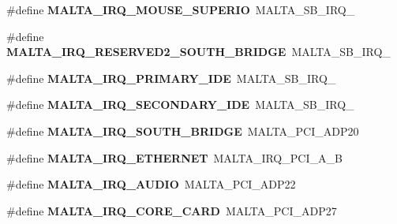 \begin{DoxyCompactItemize}
\item 
\mbox{\label{group__bsp__interrupt_ga2f977174ebf4926653deacb3089e43fb}} 
\#define {\bfseries M\+A\+L\+T\+A\+\_\+\+I\+R\+Q\+\_\+\+M\+O\+U\+S\+E\+\_\+\+S\+U\+P\+E\+R\+IO}~M\+A\+L\+T\+A\+\_\+\+S\+B\+\_\+\+I\+R\+Q\+\_
\item 
\mbox{\label{group__bsp__interrupt_gad53504e3b3b9d08772d3ac8b610424d3}} 
\#define {\bfseries M\+A\+L\+T\+A\+\_\+\+I\+R\+Q\+\_\+\+R\+E\+S\+E\+R\+V\+E\+D2\+\_\+\+S\+O\+U\+T\+H\+\_\+\+B\+R\+I\+D\+GE}~M\+A\+L\+T\+A\+\_\+\+S\+B\+\_\+\+I\+R\+Q\+\_
\item 
\mbox{\label{group__bsp__interrupt_ga225dd482d2b7455e7a8d87bc9a5c8e1f}} 
\#define {\bfseries M\+A\+L\+T\+A\+\_\+\+I\+R\+Q\+\_\+\+P\+R\+I\+M\+A\+R\+Y\+\_\+\+I\+DE}~M\+A\+L\+T\+A\+\_\+\+S\+B\+\_\+\+I\+R\+Q\+\_
\item 
\mbox{\label{group__bsp__interrupt_gab204c07703b7fe3a886591334b1e3b42}} 
\#define {\bfseries M\+A\+L\+T\+A\+\_\+\+I\+R\+Q\+\_\+\+S\+E\+C\+O\+N\+D\+A\+R\+Y\+\_\+\+I\+DE}~M\+A\+L\+T\+A\+\_\+\+S\+B\+\_\+\+I\+R\+Q\+\_
\item 
\mbox{\label{group__bsp__interrupt_ga68c241867af380c6e6721dfb43115cea}} 
\#define {\bfseries M\+A\+L\+T\+A\+\_\+\+I\+R\+Q\+\_\+\+S\+O\+U\+T\+H\+\_\+\+B\+R\+I\+D\+GE}~M\+A\+L\+T\+A\+\_\+\+P\+C\+I\+\_\+\+A\+D\+P20
\item 
\mbox{\label{group__bsp__interrupt_gaa51764b021552aa6d71793e2575e3cf0}} 
\#define {\bfseries M\+A\+L\+T\+A\+\_\+\+I\+R\+Q\+\_\+\+E\+T\+H\+E\+R\+N\+ET}~M\+A\+L\+T\+A\+\_\+\+I\+R\+Q\+\_\+\+P\+C\+I\+\_\+\+A\+\_\+B
\item 
\mbox{\label{group__bsp__interrupt_ga6fcb1e4531b407ad964e0961b7cdc284}} 
\#define {\bfseries M\+A\+L\+T\+A\+\_\+\+I\+R\+Q\+\_\+\+A\+U\+D\+IO}~M\+A\+L\+T\+A\+\_\+\+P\+C\+I\+\_\+\+A\+D\+P22
\item 
\mbox{\label{group__bsp__interrupt_gaa310256da2f3c4b7e1dfb5661cd838e3}} 
\#define {\bfseries M\+A\+L\+T\+A\+\_\+\+I\+R\+Q\+\_\+\+C\+O\+R\+E\+\_\+\+C\+A\+RD}~M\+A\+L\+T\+A\+\_\+\+P\+C\+I\+\_\+\+A\+D\+P27

\end{DoxyCompactItemize}
